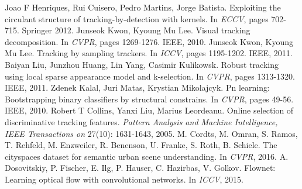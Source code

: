 \documentclass[conference]{IEEEtran}
\begin{document}
\begin{thebibliography}{00}
 Joao F Henriques, Rui Cuisero, Pedro Martins, Jorge Batista. Exploiting the circulant structure of tracking-by-detection with kernels. In \textit{ECCV}, pages 702-715. Springer 2012.
 Junseok Kwon, Kyoung Mu Lee. Visual tracking decomposition. In \textit{CVPR}, pages 1269-1276. IEEE, 2010.
 Junseok Kwon, Kyoung Mu Lee. Tracking by sampling trackers. In \textit{ICCV}, pages 1195-1202. IEEE, 2011.
 Baiyan Liu, Junzhou Huang, Lin Yang, Casimir Kulikowsk. Robust tracking using local sparse appearance model and k-selection. In \textit{CVPR}, pages 1313-1320. IEEE, 2011.
 Zdenek Kalal, Juri Matas, Krystian Mikolajcyk. Pn learning: Bootstrapping binary classifiers by structural constrains. In \textit{CVPR}, pages 49-56. IEEE, 2010.
 Robert T Collins, Yanxi Liu, Marius Leordeanu. Online selection of discriminative tracking features. \textit{Pattern Analysis and Machine Intelligence, IEEE Transactions on} 27(10): 1631-1643, 2005.
 M. Cordts, M. Omran, S. Ramos, T. Rehfeld, M. Enzweiler, R. Benenson, U. Franke, S. Roth, B. Schiele. The cityspaces dataset for semantic urban scene understanding. In \textit{CVPR}, 2016.
 A. Dosovitskiy, P. Fischer, E. Ilg, P. Hauser, C. Hazirbas, V. Golkov. Flownet: Learning optical flow with convolutional networks. In \textit{ICCV}, 2015.

\vspace{12pt}
\end{thebibliography}
\end{document}
